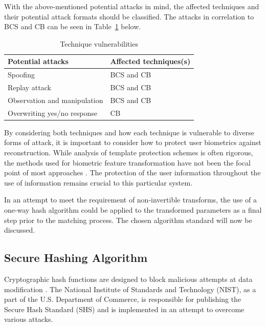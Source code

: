     With the above-mentioned potential attacks in mind, the affected techniques and their potential attack formats should be classified. The attacks in correlation to BCS and CB can be seen in Table~\ref{table:Technique vulnerabilities} below.
    
    
    \begin{table}[h]
    \caption{Technique vulnerabilities}
    \centering
     \begin{tabular}{|p{} | p{}|} 
     \hline
    	\textbf{Potential attacks} & \textbf{Affected techniques(s)} \\ [1ex] 
     \hline\hline 
     Spoofing & BCS and CB  \\[1ex]
     \hline 
     Replay attack & BCS and CB \\[1ex]
     \hline
     Observation and manipulation & BCS and CB\\[1ex]
     \hline           
     Overwriting yes/no response & CB\\[1ex]
     \hline
     \end{tabular}
     \label{table:Technique vulnerabilities}
    \end{table}
    
    
    By considering both techniques and how each technique is vulnerable to diverse forms of attack, it is important to consider how to protect user biometrics against reconstruction. While analysis of template protection schemes is often rigorous, the methods used for biometric feature transformation have not been the focal point of most approaches \citep{Nagar2009}. The protection of the user information throughout the use of information remains crucial to this particular system. 
    
    In an attempt to meet the requirement of non-invertible transforms, the use of a one-way hash algorithm could be applied to the transformed parameters as a final step prior to the matching process. The chosen algorithm standard will now be discussed.

    \subsection{ Secure Hashing Algorithm}
    
    Cryptographic hash functions are designed to block malicious attempts at data modification \citep{Pfleeger2015}. The National Institute of Standards and Technology (NIST), as a part of the U.S. Department of Commerce, is responsible for publishing the Secure Hash Standard (SHS) and is implemented in an attempt to overcome various attacks. 
    
